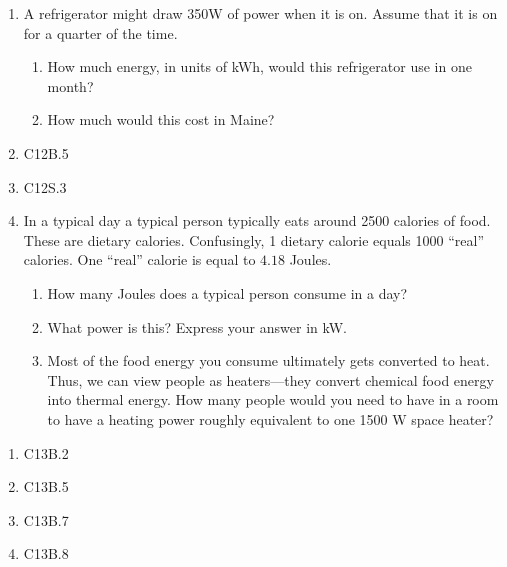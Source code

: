 \documentclass[12pt]{article}
\begin{document}
\begin{enumerate}
\setlength{\itemsep}{-1mm}
  \item A refrigerator might draw 350W of power when it is on.  Assume
    that it is on for a quarter of the time.  
  \begin{enumerate}
  \setlength{\itemsep}{-1mm}
    \item How much energy, in units of kWh, would this refrigerator
      use in one month? 
    \item How much would this cost in Maine?
  \end{enumerate}
  \item C12B.5
  \item C12S.3  \\


  \item In a typical day a typical person typically eats around 2500
    calories of food.   These are dietary
    calories. Confusingly, 1 dietary calorie equals 1000 ``real''
    calories.  One ``real'' calorie is equal to $4.18$ Joules. 
\begin{enumerate}
    \item  How many Joules does a typical person consume in a day?
    \item What power is this? Express your answer in kW.
    \item Most of the food energy you consume ultimately gets
      converted to heat. Thus, we can view people as heaters---they
      convert chemical food energy into thermal energy. How many
      people would you need to have in a room to have a heating power
      roughly equivalent to one 1500 W space heater?
\end{enumerate}

\end{enumerate}


\begin{enumerate}
\setlength{\itemsep}{-1mm}
  \item C13B.2
  \item C13B.5
  \item C13B.7
  \item C13B.8
\end{enumerate}

%
\end{document}
